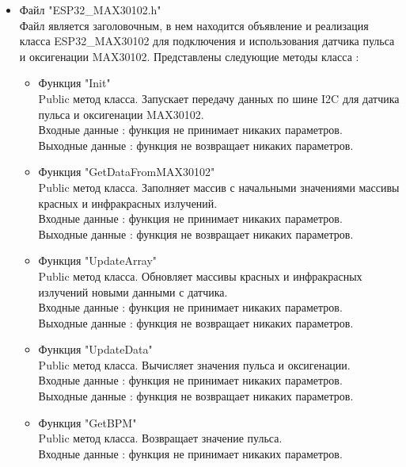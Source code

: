 \documentclass[a4document]{article}
\begin{document}
{\begin{itemize}
    \item Файл "ESP32\_MAX30102.h" \\
        Файл является заголовочным, в нем находится объявление и реализация класса ESP32\_MAX30102
        для подключения и использования датчика пульса и оксигенации MAX30102.
        Представлены следующие методы класса : 
        
        \begin{itemize}
            \item Функция "Init" \\ 
                Public метод класса. Запускает передачу данных по шине I2C для датчика пульса и оксигенации MAX30102. \\
                Входные данные : функция не принимает никаких параметров. \\
                Выходные данные : функция не возвращает никаких параметров.
            \item Функция "GetDataFromMAX30102" \\
                Public метод класса. Заполняет массив с начальными значениями массивы красных и инфракрасных излучений. \\
                Входные данные : функция не принимает никаких параметров. \\
                Выходные данные : функция не возвращает никаких параметров.
            \item Функция "UpdateArray" \\
                Public метод класса. Обновляет массивы красных и инфракрасных излучений новыми данными с датчика. \\
                Входные данные : функция не принимает никаких параметров. \\
                Выходные данные : функция не возвращает никаких параметров.
            \item Функция "UpdateData" \\
                Public метод класса. Вычисляет значения пульса и оксигенации. \\
                Входные данные : функция не принимает никаких параметров. \\
                Выходные данные : функция не возвращает никаких параметров.
            \item Функция "GetBPM" \\
                Public метод класса. Возвращает значение пульса. \\
                Входные данные : функция не принимает никаких параметров. \\

\end{itemize}
\end{itemize}}
\end{document}
